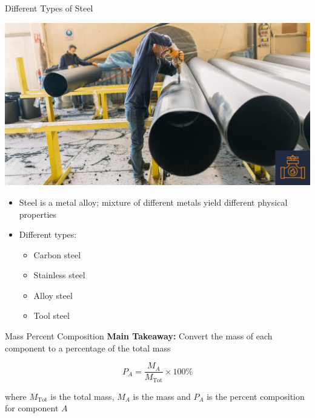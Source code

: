 \documentclass[11pt]{beamer}
\begin{document}
\begin{frame}{Different Types of Steel}
  \begin{center}
    \includegraphics[scale=0.12]{steel_type}
  \end{center}

  \begin{itemize}
  \item Steel is a metal alloy; mixture of different
    metals yield different physical properties
  \item Different types:
    \begin{itemize}
    \item Carbon steel
    \item Stainless steel
    \item Alloy steel
    \item Tool steel
    \end{itemize}
  \end{itemize}
\end{frame}

\begin{frame}{Mass Percent Composition}
  \textbf{Main Takeaway:} Convert the mass of each component
  to a percentage of the total mass

  \begin{equation}
    P_A = \frac{M_A}{M_\text{Tot}} \times 100\%
  \end{equation}

  where $M_\text{Tot}$ is the total mass, $M_A$ is the mass and $P_A$
  is the percent composition for component $A$  
\end{frame}
\end{document}

